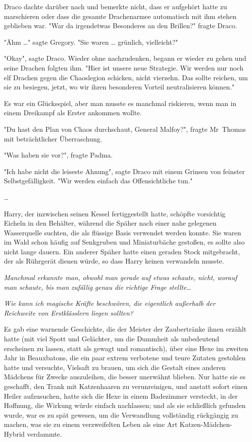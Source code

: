 {Draco dachte darüber nach und bemerkte nicht, dass er aufgehört hatte zu marschieren oder dass die gesamte Drachenarmee automatisch mit ihm stehen geblieben war. "War da irgendetwas Besonderes an den Brillen?" fragte Draco.

"Ähm …" sagte Gregory. "Sie waren … grünlich, vielleicht?"

"Okay", sagte Draco. Wieder ohne nachzudenken, begann er wieder zu gehen und seine Drachen folgten ihm. "Hier ist unsere neue Strategie. Wir werden nur noch elf Drachen gegen die Chaoslegion schicken, nicht vierzehn. Das sollte reichen, um sie zu besiegen, jetzt, wo wir ihren besonderen Vorteil neutralisieren können."

Es war ein Glücksspiel, aber man musste es manchmal riskieren, wenn man in einem Dreikampf als Erster ankommen wollte.

"Du hast den Plan von Chaos durchschaut, General Malfoy?", fragte Mr~Thomas mit beträchtlicher Überraschung.

"Was haben sie vor?", fragte Padma.

"Ich habe nicht die leiseste Ahnung", sagte Draco mit einem Grinsen von feinster Selbstgefälligkeit. "Wir werden einfach das Offensichtliche tun."

…

Harry, der inzwischen seinen Kessel fertiggestellt hatte, schöpfte vorsichtig Eicheln in den Behälter, während die Späher nach einer nahe gelegenen Wasserquelle suchten, die als flüssige Basis verwendet werden konnte. Sie waren im Wald schon häufig auf Senkgruben und Miniaturbäche gestoßen, es sollte also nicht lange dauern. Ein anderer Späher hatte einen geraden Stock mitgebracht, der als Rührgerät dienen würde, so dass Harry keinen verwandeln musste.

\emph{Manchmal erkannte man, obwohl man gerade auf etwas schaute, nicht, worauf man schaute, bis man zufällig genau die richtige Frage stellte…}

\emph{Wie kann ich magische Kräfte beschwören, die eigentlich außerhalb der Reichweite von Erstklässlern liegen sollten?}

Es gab eine warnende Geschichte, die der Meister der Zaubertränke ihnen erzählt hatte (mit viel Spott und Gelächter, um die Dummheit als unbedeutend erscheinen zu lassen, statt als gewagt und romantisch), über eine Hexe im zweiten Jahr in Beauxbatons, die ein paar extrem verbotene und teure Zutaten gestohlen hatte und versuchte, Vielsaft zu brauen, um sich die Gestalt eines anderen Mädchens für Zwecke auszuleihen, die besser unerwähnt blieben. Nur hatte sie es geschafft, den Trank mit Katzenhaaren zu verunreinigen, und anstatt sofort einen Heiler aufzusuchen, hatte sich die Hexe in einem Badezimmer versteckt, in der Hoffnung, die Wirkung würde einfach nachlassen; und als sie schließlich gefunden wurde, war es zu spät gewesen, um die Verwandlung vollständig rückgängig zu machen, was sie zu einem verzweifelten Leben als eine Art Katzen-Mädchen-Hybrid verdammte.

}
